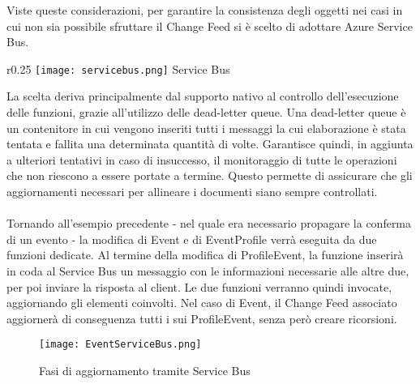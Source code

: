 Viste queste considerazioni,
per garantire la consistenza degli oggetti 
nei casi in cui non sia possibile sfruttare il Change Feed
si è scelto di adottare Azure Service Bus.
\begin{wrapfigure}{r}{0.25\textwidth}
    \centering
    \texttt{[image: servicebus.png]}
    Service Bus
\end{wrapfigure}
La scelta deriva principalmente dal supporto nativo
al controllo dell'esecuzione delle funzioni,
grazie all'utilizzo delle dead-letter queue.
Una dead-letter queue è un contenitore in cui vengono inseriti
tutti i messaggi la cui elaborazione è stata tentata e fallita una determinata quantità di volte.
Garantisce quindi, in aggiunta a ulteriori tentativi in caso di insuccesso,
il monitoraggio di tutte le operazioni che non riescono a essere portate a termine.
Questo permette di assicurare che gli aggiornamenti necessari per allineare i documenti
siano sempre controllati.\\
\\
Tornando all'esempio precedente
- nel quale era necessario propagare la conferma di un evento -
la modifica di Event e di EventProfile verrà eseguita da due funzioni dedicate.
Al termine della modifica di ProfileEvent,
la funzione inserirà in coda al Service Bus un messaggio
con le informazioni necessarie alle altre due,
per poi inviare la risposta al client.
Le due funzioni verranno quindi invocate,
aggiornando gli elementi coinvolti.
Nel caso di Event, il Change Feed associato aggiornerà di conseguenza
tutti i sui ProfileEvent, senza però creare ricorsioni.\\

\begin{figure}[h!]
    \centering
    \texttt{[image: EventServiceBus.png]}
    \caption{Fasi di aggiornamento tramite Service Bus}
\end{figure}




\clearpage
